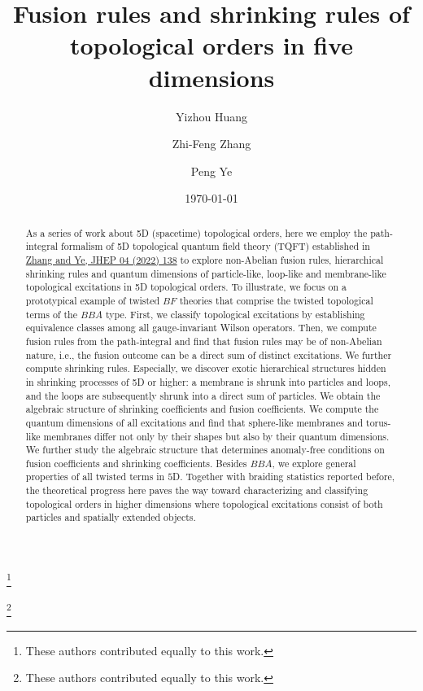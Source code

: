 \documentclass[11pt,nofootinbib,preprint]{revtex4-1}
\begin{document}
\title{Fusion rules and shrinking rules of topological orders in five dimensions}
\author{Yizhou Huang}
\thanks{These authors contributed equally to this work.}
 \author{Zhi-Feng Zhang}
\thanks{These authors contributed equally to this work.}
 \author{Peng Ye}
\date{\today}
\begin{abstract}
As a series of work about 5D (spacetime) topological orders, here we employ the path-integral formalism of 5D  topological quantum field theory  (TQFT) established in \href{https://doi.org/10.1007/JHEP04(2022)138}{Zhang and Ye, JHEP 04 (2022) 138}  to explore non-Abelian fusion rules,  hierarchical shrinking rules and quantum dimensions of particle-like, loop-like and membrane-like topological excitations in 5D topological orders.  To illustrate, we focus on a prototypical example of twisted $BF$ theories that comprise the twisted topological terms of the $BBA$ type. First, we classify topological excitations by establishing equivalence classes among all gauge-invariant Wilson operators. Then, we compute fusion rules from the path-integral and find that fusion rules may be of non-Abelian nature, i.e., the fusion outcome can be a direct sum of distinct excitations. We further compute shrinking rules. Especially, we discover exotic hierarchical structures hidden in shrinking processes of 5D or higher:  a membrane is shrunk into particles and loops, and the loops are subsequently shrunk into a direct sum of particles. We obtain the algebraic structure of shrinking coefficients and fusion coefficients.  We compute the quantum dimensions of all excitations and find that sphere-like membranes and torus-like membranes differ not only by their shapes but also by their quantum dimensions. We further study the algebraic structure that determines anomaly-free conditions on fusion coefficients and shrinking coefficients. Besides $BBA$, we explore general properties of all twisted terms in $5$D. Together with braiding statistics reported before, the theoretical progress here paves the way toward characterizing and classifying topological orders in higher dimensions where topological excitations consist of both particles and spatially extended objects. 
\end{abstract}
\maketitle
\newpage
\tableofcontents{}
\end{document}
